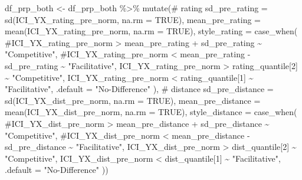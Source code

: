\documentclass[
  letterpaper,
  DIV=11,
  numbers=noendperiod]{scrartcl}
\newenvironment{Shaded}{\begin{snugshade}}{\end{snugshade}}
\newcommand{\AttributeTok}[1]{\textcolor[rgb]{0.40,0.45,0.13}{#1}}
\newcommand{\CommentTok}[1]{\textcolor[rgb]{0.37,0.37,0.37}{#1}}
\newcommand{\ConstantTok}[1]{\textcolor[rgb]{0.56,0.35,0.01}{#1}}
\newcommand{\DecValTok}[1]{\textcolor[rgb]{0.68,0.00,0.00}{#1}}
\newcommand{\FunctionTok}[1]{\textcolor[rgb]{0.28,0.35,0.67}{#1}}
\newcommand{\NormalTok}[1]{\textcolor[rgb]{0.00,0.23,0.31}{#1}}
\newcommand{\OtherTok}[1]{\textcolor[rgb]{0.00,0.23,0.31}{#1}}
\newcommand{\SpecialCharTok}[1]{\textcolor[rgb]{0.37,0.37,0.37}{#1}}
\newcommand{\StringTok}[1]{\textcolor[rgb]{0.13,0.47,0.30}{#1}}
\begin{document}
\begin{Shaded}
\begin{Highlighting}[]
\NormalTok{df\_prp\_both }\OtherTok{\textless{}{-}}\NormalTok{ df\_prp\_both }\SpecialCharTok{\%\textgreater{}\%}
  \FunctionTok{mutate}\NormalTok{(}\CommentTok{\# rating}
         \AttributeTok{sd\_pre\_rating =} \FunctionTok{sd}\NormalTok{(ICI\_YX\_rating\_pre\_norm, }\AttributeTok{na.rm =} \ConstantTok{TRUE}\NormalTok{),}
         \AttributeTok{mean\_pre\_rating =} \FunctionTok{mean}\NormalTok{(ICI\_YX\_rating\_pre\_norm, }\AttributeTok{na.rm =} \ConstantTok{TRUE}\NormalTok{),}
         \AttributeTok{style\_rating =} \FunctionTok{case\_when}\NormalTok{(}
           \CommentTok{\#ICI\_YX\_rating\_pre\_norm \textgreater{} mean\_pre\_rating + sd\_pre\_rating \textasciitilde{} "Competitive",}
           \CommentTok{\#ICI\_YX\_rating\_pre\_norm \textless{} mean\_pre\_rating {-} sd\_pre\_rating \textasciitilde{} "Facilitative",}
\NormalTok{           ICI\_YX\_rating\_pre\_norm }\SpecialCharTok{\textgreater{}}\NormalTok{ rating\_quantile[}\DecValTok{2}\NormalTok{] }\SpecialCharTok{\textasciitilde{}} \StringTok{"Competitive"}\NormalTok{,}
\NormalTok{           ICI\_YX\_rating\_pre\_norm }\SpecialCharTok{\textless{}}\NormalTok{ rating\_quantile[}\DecValTok{1}\NormalTok{] }\SpecialCharTok{\textasciitilde{}} \StringTok{"Facilitative"}\NormalTok{,}
           \AttributeTok{.default =} \StringTok{"No{-}Difference"}
\NormalTok{         ),}
         \CommentTok{\# distance}
         \AttributeTok{sd\_pre\_distance =} \FunctionTok{sd}\NormalTok{(ICI\_YX\_dist\_pre\_norm, }\AttributeTok{na.rm =} \ConstantTok{TRUE}\NormalTok{),}
         \AttributeTok{mean\_pre\_distance =} \FunctionTok{mean}\NormalTok{(ICI\_YX\_dist\_pre\_norm, }\AttributeTok{na.rm =} \ConstantTok{TRUE}\NormalTok{),}
         \AttributeTok{style\_distance =} \FunctionTok{case\_when}\NormalTok{(}
           \CommentTok{\#ICI\_YX\_dist\_pre\_norm \textgreater{} mean\_pre\_distance + sd\_pre\_distance \textasciitilde{} "Competitive",}
           \CommentTok{\#ICI\_YX\_dist\_pre\_norm \textless{} mean\_pre\_distance {-} sd\_pre\_distance \textasciitilde{} "Facilitative",}
\NormalTok{           ICI\_YX\_dist\_pre\_norm }\SpecialCharTok{\textgreater{}}\NormalTok{ dist\_quantile[}\DecValTok{2}\NormalTok{] }\SpecialCharTok{\textasciitilde{}} \StringTok{"Competitive"}\NormalTok{,}
\NormalTok{           ICI\_YX\_dist\_pre\_norm }\SpecialCharTok{\textless{}}\NormalTok{ dist\_quantile[}\DecValTok{1}\NormalTok{] }\SpecialCharTok{\textasciitilde{}} \StringTok{"Facilitative"}\NormalTok{,}
           \AttributeTok{.default =} \StringTok{"No{-}Difference"}
\NormalTok{         ))}
\end{Highlighting}
\end{Shaded}
\end{document}
